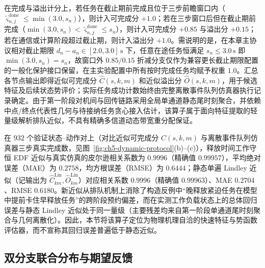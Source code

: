 在完成与溢出计分上，若任务在截止期前完成且位于三步前瞻窗口内（$\tilde\varsigma_{n,j}^{\mathrm{done}}\leq\allowbreak\min(3.0,\allowbreak s_n)$），则计入可完成分 $+1.0$；若在三步窗口后但在截止期前完成（$\min(3.0,\allowbreak s_n)<\allowbreak\tilde\varsigma_{n,j}^{\mathrm{done}}\leq s_n$），则计入可完成分 $+0.85$ 与溢出分 $+0.15$；若在通信或计算阶段超过截止期，则计入溢出分 $+1.0$。需说明的是，在本章主协议相对截止期限 $d_n-a_n\in[2.0,3.0]\,\mathrm{s}$ 下，任意在途任务恒满足 $s_n\leq 3.0\,\mathrm{s}$ 即 $\min(3.0,s_n)=s_n$，故窗口外 $0.85/0.15$ 折减分支仅作为兼容更长截止期限配置的一般化保护接口保留，在主实验配置中所有按时完成任务均赋予权重 $1.0$。汇总各节点输出即得近似可完成分 $\widehat C(s,k,m)$ 和近似溢出分 $\widehat O(s,k,m)$，用于候选特征及后续状态势评价；实际任务成功计数始终由完整离散事件队列仿真器执行记录确定。由于第一阶段对机间与回传链路采用全局单通道静态尾时刻聚合，并依赖中点/终点代表性几何与待接纳任务贪心接入估计，该算子属于面向特征提取的轻量级解析排队近似，不具有精确多信道动态带宽重分配保证。

在 $932$ 个验证状态--动作对上（对比近似可完成分 $\widehat C(s,k,m)$ 与离散事件队列仿真器三步真实完成数，见图~\ref{fig:ch5-dynamic-protocol}(b)--(c)），释放时间工作守恒 EDF 近似与真实仿真的皮尔逊相关系数为 $0.9996$（精确值 $0.99957$），平均绝对误差（MAE）为 $0.2758$，均方根误差（RMSE）为 $0.6444$；静态单遍 Lindley 近似（记输出为 $\widehat{C}_{km}^{\mathrm{Lin}},\widehat{O}_{km}^{\mathrm{Lin}}$）对应相关系数 $0.9996$（精确值 $0.99963$）、MAE $0.2704$、RMSE $0.6180$。新近似从排队机制上消除了构造反例中“晚释放紧迫任务在模型中提前卡住早释放任务”的跨阶段预约偏差，而在实测工作负载状态上的总体回归误差与静态 Lindley 近似处于同一量级（主要残差均来自第一阶段单通道尾时刻聚合与几何离散化）。因此，本节将该算子定位为物理机理自洽的快速特征与势函数评估器，而不宣称其回归误差普遍低于静态近似。

\subsection{双分支联合分布与期望反馈}

